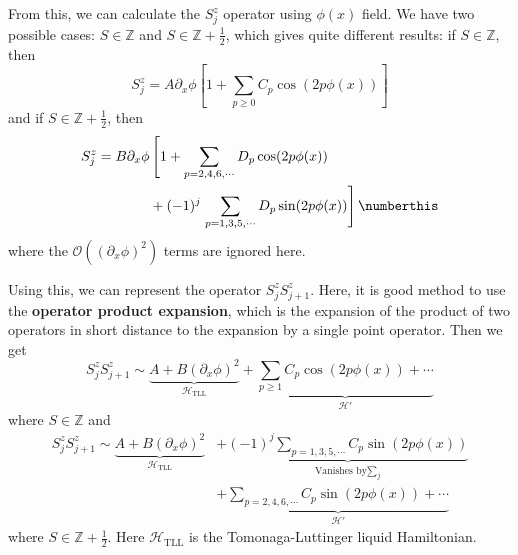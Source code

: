 From this, we can calculate the $S_j^z$ operator using $\phi(x)$ field. We have two possible cases: $S\in \mathbb{Z}$ and $S\in \mathbb{Z}+\frac{1}{2}$, which gives quite different results: if $S\in \mathbb{Z}$, then
\begin{equation}
S_j^z=A\partial_x \phi\left[1+\sum_{p\geq 0}C_p\cos(2p\phi(x))\right]
\end{equation}
and if $S\in \mathbb{Z}+\frac{1}{2}$, then
\begin{align*}
S_j^z=B\partial_x \phi&\left[1+\sum_{p=2,4,6,\cdots}D_p\cos(2p\phi(x))\right.\\
&+(-1)^j\left.\sum_{p=1,3,5,\cdots}D_p\sin(2p\phi(x))\right]\numberthis
\end{align*}
where the $\mathcal{O}((\partial_x\phi)^2)$ terms are ignored here.

Using this, we can represent the operator $S_j^zS_{j+1}^z$. Here, it is good method to use the \textbf{operator product expansion}, which is the expansion of the product of two operators in short distance to the expansion by a single point operator. Then we get
\begin{equation}
S_j^z S_{j+1}^z\sim \underbrace{A+B(\partial_x\phi)^2}_{\mathcal{H}_{\textrm{TLL}}}+\underbrace{\sum_{p\geq 1}C_p \cos(2p\phi(x))+\cdots}_{\mathcal{H}'}
\end{equation}
where $S\in \mathbb{Z}$ and
\begin{align*}
S_j^{z} S_{j+1}^z\sim \underbrace{A+B(\partial_x\phi)^2}_{\mathcal{H}_{\textrm{TLL}}}&+\underbrace{(-1)^j\sum_{p=1,3,5,\cdots}C_p\sin(2p\phi(x))}_{\textrm{Vanishes by} \sum_j}\\
&+\underbrace{\sum_{p=2,4,6,\cdots}C_p\sin(2p\phi(x))+\cdots}_{\mathcal{H}'}
\end{align*}
where $S\in \mathbb{Z}+\frac{1}{2}$. Here $\mathcal{H}_{\textrm{TLL}}$ is the Tomonaga-Luttinger liquid Hamiltonian.

